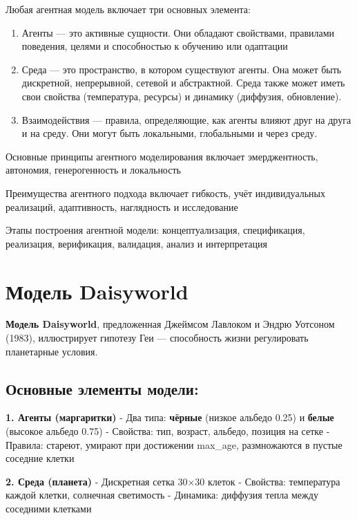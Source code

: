 \documentclass[
  12pt,
  a4paper,
  DIV=11,
  numbers=noendperiod]{scrreprt}
\begin{document}
Любая агентная модель включает три основных элемента:

\begin{enumerate}
\def\labelenumi{\arabic{enumi}.}
\item
  Агенты --- это активные сущности. Они обладают свойствами, правилами
  поведения, целями и способностью к обучению или одаптации
\item
  Среда --- это пространство, в котором существуют агенты. Она может
  быть дискретной, непрерывной, сетевой и абстрактной. Среда также может
  иметь свои свойства (температура, ресурсы) и динамику (диффузия,
  обновление).
\item
  Взаимодействия --- правила, определяющие, как агенты влияют друг на
  друга и на среду. Они могут быть локальными, глобальными и через
  среду.
\end{enumerate}

Основные принципы агентного моделирования включает эмерджентность,
автономия, генерогенность и локальность

Преимущества агентного подхода включает гибкость, учёт индивидуальных
реализаций, адаптивность, наглядность и исследование

Этапы построения агентной модели: концептуализация, спецификация,
реализация, верификация, валидация, анализ и интерпретация

\section{Модель
Daisyworld}\label{ux43cux43eux434ux435ux43bux44c-daisyworld}

\textbf{Модель Daisyworld}, предложенная Джеймсом Лавлоком и Эндрю
Уотсоном (1983), иллюстрирует гипотезу Геи --- способность жизни
регулировать планетарные условия.

\subsection{Основные элементы
модели:}\label{ux43eux441ux43dux43eux432ux43dux44bux435-ux44dux43bux435ux43cux435ux43dux442ux44b-ux43cux43eux434ux435ux43bux438}

\textbf{1. Агенты (маргаритки)} - Два типа: \textbf{чёрные} (низкое
альбедо 0.25) и \textbf{белые} (высокое альбедо 0.75) - Свойства: тип,
возраст, альбедо, позиция на сетке - Правила: стареют, умирают при
достижении max\_age, размножаются в пустые соседние клетки

\textbf{2. Среда (планета)} - Дискретная сетка 30×30 клеток - Свойства:
температура каждой клетки, солнечная светимость - Динамика: диффузия
тепла между соседними клетками
\end{document}
